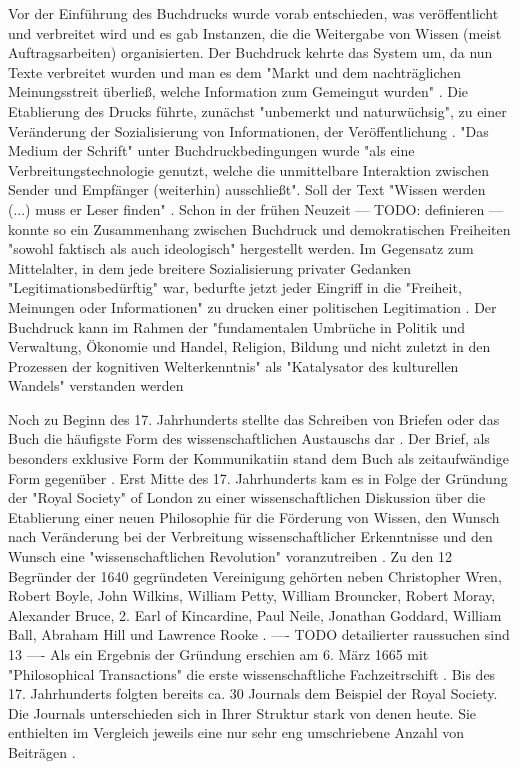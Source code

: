 Vor der Einführung des Buchdrucks wurde vorab entschieden, was veröffentlicht und verbreitet wird und es gab Instanzen, die die Weitergabe von Wissen (meist Auftragsarbeiten) organisierten. Der Buchdruck kehrte das System um, da nun Texte verbreitet wurden und man es dem "Markt und dem nachträglichen Meinungsstreit überließ, welche Information zum Gemeingut wurden" \cite{giesecke_1991_buchdruck}. Die Etablierung des Drucks führte, zunächst "unbemerkt und naturwüchsig", zu einer Veränderung der Sozialisierung von Informationen, der Veröffentlichung \cite{giesecke_1991_buchdruck}. "Das Medium der Schrift" unter Buchdruckbedingungen wurde "als eine Verbreitungstechnologie genutzt, welche die unmittelbare Interaktion zwischen Sender und Empfänger (weiterhin) ausschließt". Soll der Text "Wissen werden (...) muss er Leser finden" \cite{Luhmann1998}. Schon in der frühen Neuzeit --- TODO: definieren --- konnte so ein Zusammenhang zwischen Buchdruck und demokratischen Freiheiten "sowohl faktisch als auch ideologisch" hergestellt werden. Im Gegensatz zum Mittelalter, in dem jede breitere Sozialisierung privater Gedanken "Legitimationsbedürftig" war, bedurfte jetzt jeder Eingriff in die "Freiheit, Meinungen oder Informationen" zu drucken einer politischen Legitimation \cite{giesecke_1991_buchdruck}. Der Buchdruck kann im Rahmen der "fundamentalen Umbrüche in Politik und Verwaltung, Ökonomie und Handel, Religion, Bildung und nicht zuletzt in den Prozessen der kognitiven Welterkenntnis" \cite{pscheida_2010_wikipedia} als "Katalysator des kulturellen Wandels"\cite{giesecke_1991_buchdruck} verstanden werden

Noch zu Beginn des 17. Jahrhunderts stellte das Schreiben von Briefen oder das Buch die häufigste Form des wissenschaftlichen Austauschs dar \cite{porter_1964_scientific}. Der Brief, als besonders exklusive Form der Kommunikatiin stand dem Buch als zeitaufwändige Form gegenüber \cite{fecher_hiig_2014}. Erst Mitte des 17. Jahrhunderts kam es in Folge der Gründung der "Royal Society" of London zu einer wissenschaftlichen Diskussion über die Etablierung einer neuen Philosophie für die Förderung von Wissen, den Wunsch nach Veränderung bei der Verbreitung wissenschaftlicher Erkenntnisse und den Wunsch eine "wissenschaftlichen Revolution" voranzutreiben \cite{Dear_1985}. Zu den 12 Begründer der 1640 gegründeten Vereinigung gehörten neben Christopher Wren, Robert Boyle, John Wilkins, William Petty, William Brouncker, Robert Moray, Alexander Bruce, 2. Earl of Kincardine, Paul Neile, Jonathan Goddard, William Ball, Abraham Hill und Lawrence Rooke \cite{suchen}. ---- TODO detailierter raussuchen sind 13 ---- Als ein Ergebnis der Gründung erschien am 6. März 1665 mit "Philosophical Transactions" die erste wissenschaftliche Fachzeitrschift \cite{suchen}. Bis des 17. Jahrhunderts folgten bereits ca. 30 Journals dem Beispiel der Royal Society. Die Journals unterschieden sich in Ihrer Struktur stark von denen heute. Sie enthielten im Vergleich jeweils eine nur sehr eng umschriebene Anzahl von Beiträgen \cite{suchen}.

